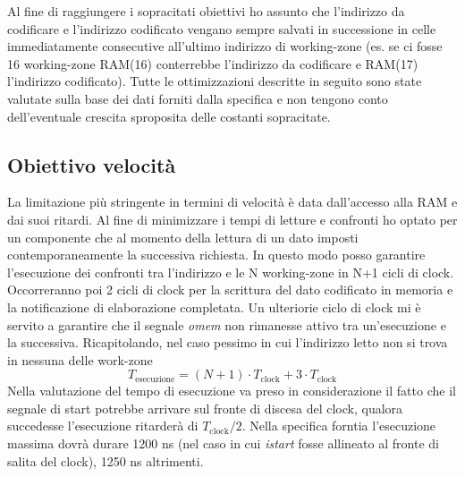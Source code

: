\documentclass{article}
\begin{document}
Al fine di raggiungere i sopracitati obiettivi ho assunto che l'indirizzo da codificare e l'indirizzo codificato vengano sempre salvati in successione in celle immediatamente consecutive all'ultimo indirizzo di working-zone (es. se ci fosse 16 working-zone RAM(16) conterrebbe l'indirizzo da codificare e RAM(17) l'indirizzo codificato).
Tutte le ottimizzazioni descritte in seguito sono state valutate sulla base dei dati forniti dalla specifica e non tengono conto dell'eventuale crescita sproposita delle costanti sopracitate.
\subsection{Obiettivo velocità}
La limitazione più stringente in termini di velocità è data dall'accesso alla RAM e dai suoi ritardi. Al fine di minimizzare i tempi di letture e confronti ho optato per un componente che al momento della lettura di un dato imposti contemporaneamente la successiva richiesta. In questo modo posso garantire l'esecuzione dei confronti tra l'indirizzo e le N working-zone in N+1 cicli di clock. Occorreranno poi 2 cicli di clock per la scrittura del dato codificato in memoria e la notificazione di elaborazione completata. Un ulteriorie ciclo di clock mi è servito a garantire che il segnale \textit{o\textunderscore mem} non rimanesse attivo tra un'esecuzione e la successiva.
Ricapitolando, nel caso pessimo in cui l'indirizzo letto non si trova in nessuna delle work-zone
\begin{equation*}
T_\mathrm{esecuzione} = (N+1) \cdot T_\mathrm{clock}+3 \cdot T_\mathrm{clock}
\end{equation*}
Nella valutazione del tempo di esecuzione va preso in considerazione il fatto che il segnale di start potrebbe arrivare sul fronte di discesa del clock, qualora succedesse l'esecuzione ritarderà di $T_\mathrm{clock}/2$.
Nella specifica forntia l'esecuzione massima dovrà durare 1200 ns (nel caso in cui \textit{i\textunderscore start} fosse allineato al fronte di salita del clock), 1250 ns altrimenti.
\end{document}
